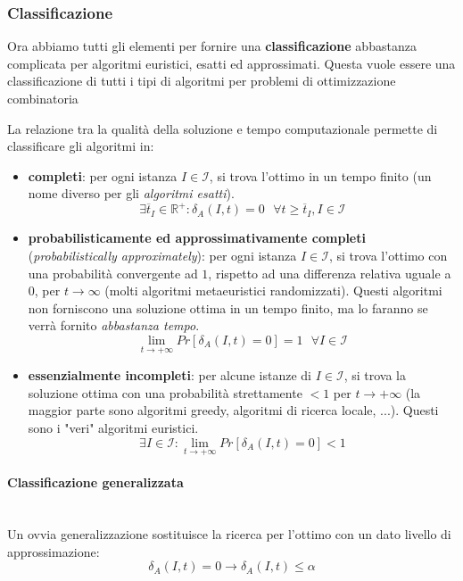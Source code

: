 \documentclass{article}
\begin{document}
\subsubsection{Classificazione}
Ora abbiamo tutti gli elementi per fornire una \textbf{classificazione} abbastanza complicata per
algoritmi euristici, esatti ed approssimati. Questa vuole essere una classificazione di tutti
i tipi di algoritmi per problemi di ottimizzazione combinatoria

La relazione tra la qualità della soluzione e tempo computazionale permette di classificare gli
algoritmi in:
\begin{itemize}
    \item \textbf{completi}: per ogni istanza $I\in\mathcal{I}$, si trova l'ottimo in un tempo finito (un
          nome diverso per gli \textit{algoritmi esatti}).
          $$\exists\overline{t}_I\in\mathbb{R}^+ :\delta_A(I,t)=0 \text{  }\forall t\geq\overline{t}_I,I\in\mathcal{I}$$

    \item \textbf{probabilisticamente ed approssimativamente completi} (\textit{probabilistically approximately}):
          per ogni istanza $I\in\mathcal{I}$, si trova l'ottimo con una probabilità convergente ad $1$, rispetto
          ad una differenza relativa uguale a $0$, per $t\rightarrow\infty$
          (molti algoritmi metaeuristici randomizzati). Questi algoritmi non forniscono una soluzione ottima in un
          tempo finito, ma lo faranno se verrà fornito \textit{abbastanza tempo}.
          $$\lim_{t\rightarrow +\infty}Pr[\delta_A(I,t)=0]=1\text{  }\forall I\in\mathcal{I}$$

    \item \textbf{essenzialmente incompleti}: per alcune istanze di $I\in\mathcal{I}$, si trova
          la soluzione ottima con una probabilità strettamente $<1$ per $t\rightarrow +\infty$ (la maggior
          parte sono algoritmi greedy, algoritmi di ricerca locale, ...). Questi sono i "veri" algoritmi
          euristici.
          $$\exists I\in\mathcal{I}:\lim_{t\rightarrow +\infty}Pr[\delta_A(I,t)=0]<1$$
\end{itemize}

\paragraph{Classificazione generalizzata}\mbox{}\\
Un ovvia generalizzazione sostituisce la ricerca per l'ottimo con un dato livello di approssimazione:
$$\delta_A(I,t)=0\rightarrow\delta_A(I,t)\leq\alpha$$
\end{document}
